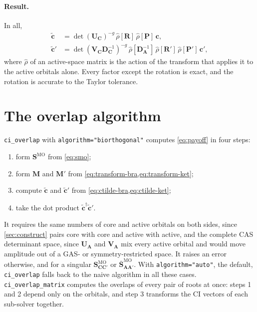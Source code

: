 \documentclass[aip,jcp,preprint]{revtex4-1}
\newcommand{\bvec}[1]{\mathbf{#1}}
\newcommand{\SMO}{\bvec{S}^{\mathrm{MO}}}
\begin{document}
\paragraph{Result.}
In all,
\begin{align}
 \tilde{\bvec{c}} &= \det(\bvec{U}_{\bvec{C}})^{-g}\,
 \hat{\rho}[\bvec{R}]\,\hat{\rho}[\bvec{P}]\,\bvec{c},
 \label{eq:ctilde-bra}\\
 \tilde{\bvec{c}}' &= \det(\bvec{V}_{\bvec{C}}\bvec{D}_{\bvec{C}}^{-1})^{-g}\,
 \hat{\rho}[\bvec{D}_{\bvec{A}}^{-1}]\,\hat{\rho}[\bvec{R}']\,
 \hat{\rho}[\bvec{P}']\,\bvec{c}',
 \label{eq:ctilde-ket}
\end{align}
where $\hat{\rho}$ of an active-space matrix is the action of the transform that applies it to the active orbitals alone.
Every factor except the rotation is exact, and the rotation is accurate to the Taylor tolerance.

\section{The overlap algorithm}
\label{sec:algorithm}

\texttt{ci\_overlap} with \texttt{algorithm="biorthogonal"} computes \cref{eq:payoff} in four steps:
\begin{enumerate}
\item form $\SMO$ from \cref{eq:smo};
\item form $\bvec{M}$ and $\bvec{M}'$ from \cref{eq:transform-bra,eq:transform-ket};
\item compute $\tilde{\bvec{c}}$ and $\tilde{\bvec{c}}'$ from \cref{eq:ctilde-bra,eq:ctilde-ket};
\item take the dot product $\tilde{\bvec{c}}^\dagger\tilde{\bvec{c}}'$.
\end{enumerate}
It requires the same numbers of core and active orbitals on both sides, since \cref{sec:construct} pairs core with core and active with active, and the complete CAS determinant space, since $\bvec{U}_{\bvec{A}}$ and $\bvec{V}_{\bvec{A}}$ mix every active orbital and would move amplitude out of a GAS- or symmetry-restricted space.
It raises an error otherwise, and for a singular $\SMO_{\bvec{C}\bvec{C}'}$ or $\bar{\bvec{S}}^{\mathrm{MO}}_{\bvec{A}\bvec{A}'}$.
With \texttt{algorithm="auto"}, the default, \texttt{ci\_overlap} falls back to the naive algorithm in all these cases.
\texttt{ci\_overlap\_matrix} computes the overlaps of every pair of roots at once: steps 1 and 2 depend only on the orbitals, and step 3 transforms the CI vectors of each sub-solver together.
\end{document}
